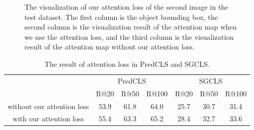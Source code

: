 \begin{figure}[H]
{\begin{minipage}[t]{5cm}
	\end{minipage}}
	
	\caption[The visualization of our attention loss of the second image in the test dataset]{The visualization of our attention loss of the second image in the test dataset. The first column is the object bounding box, the second column is the visualization result of the attention map when we use the attention loss, and the third column is the visualization result of the attention map without our attention loss.}
	\label{fig:bus}
\end{figure}


\begin{table}[!h]
	\centering
	\begin{tabular}{c|ccc|ccc}
		\bottomrule
		\multirow{2}{*}{}           & \multicolumn{3}{c|}{PredCLS} & \multicolumn{3}{c}{SGCLS} \\ \cline{2-7} 
		& R@20    & R@50    & R@100    & R@20   & R@50   & R@100   \\ \hline
		without our attention  loss & 53.9      & 61.8       & 64.0       & 25.7     & 30.7     & 31.4   \\
		with our attention loss     & 55.4       & 63.3       & 65.2        & 28.4      & 32.7      &33.6     \\ \bottomrule
	\end{tabular}
	
	\caption[The result of attention loss in PredCLS and SGCLS]{The result of attention loss in PredCLS and SGCLS.}
	\label{tab:result_attetnion_loss}
\end{table}


